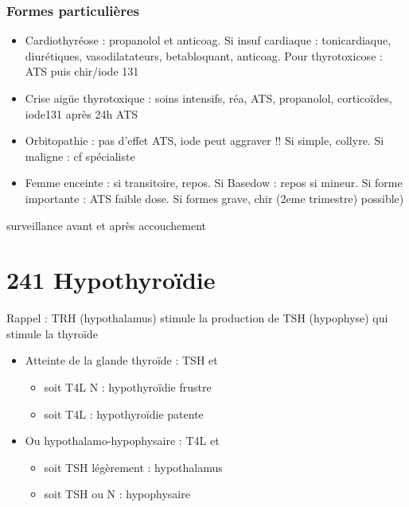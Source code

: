 \documentclass{book}
\begin{document}
\subsubsection{Formes particulières}
\label{sec:org19bb405}
\begin{itemize}
\item Cardiothyréose : propanolol et anticoag. Si insuf cardiaque : tonicardiaque,
diurétiques, vasodilatateurs, betabloquant, anticoag. Pour thyrotoxicose : ATS
puis chir/iode 131
\item Crise aigüe thyrotoxique : soins intensifs, réa, ATS, propanolol, corticoïdes,
iode131 après 24h ATS
\item Orbitopathie : pas d'effet ATS, iode peut aggraver !! Si simple, collyre. Si maligne : cf spécialiste
\item Femme enceinte : si transitoire, repos. Si Basedow : repos si mineur. Si forme
importante : ATS faible dose. Si formes grave, chir (2eme trimestre) possible)
\end{itemize}
\thus surveillance avant et après accouchement  

\section{241 \textdagger{} Hypothyroïdie}
\label{sec:org2b142dc}
\begin{tcolorbox}
Rappel : TRH (hypothalamus) stimule la production de TSH (hypophyse) qui stimule la thyroïde
\end{tcolorbox}

\begin{itemize}
\item Atteinte de la glande thyroïde  : \inc TSH et 
\begin{itemize}
\item soit T4L N : hypothyroïdie frustre
\item soit T4L \dec : hypothyroïdie patente
\end{itemize}
\item Ou hypothalamo-hypophysaire : T4L \dec et 
\begin{itemize}
\item soit TSH légèrement \inc : hypothalamus
\item soit TSH \dec ou N : hypophysaire
\end{itemize}
\end{itemize}
\end{document}
